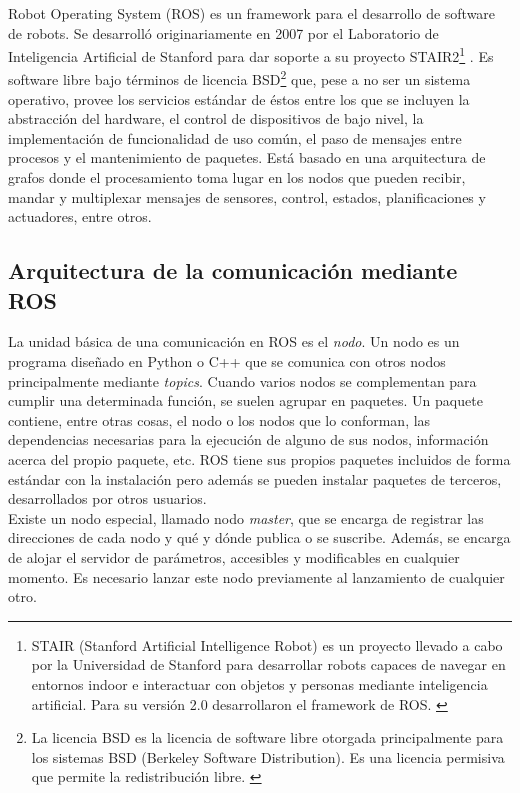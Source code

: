 Robot Operating System (ROS) es un framework para el desarrollo de software de robots. Se desarrolló originariamente en 2007 por el Laboratorio de Inteligencia Artificial de Stanford para dar soporte a su proyecto STAIR2\footnote{STAIR (Stanford Artificial Intelligence Robot) es un proyecto llevado a cabo por la Universidad de Stanford para desarrollar robots capaces de navegar en entornos indoor e interactuar con objetos y personas mediante inteligencia artificial. Para su versión 2.0 desarrollaron el framework de ROS. \cite{stair}} \cite{stair_paper}. Es software libre bajo términos de licencia BSD\footnote{La licencia BSD es la licencia de software libre otorgada principalmente para los sistemas BSD (Berkeley Software Distribution). Es una licencia permisiva que permite la redistribución libre. \cite{licencia}} que, pese a no ser un sistema operativo, provee los servicios estándar de éstos entre los que se incluyen la abstracción del hardware, el control de dispositivos de bajo nivel, la implementación de funcionalidad de uso común, el paso de mensajes entre procesos y el mantenimiento de paquetes. Está basado en una arquitectura de grafos donde el procesamiento toma lugar en los nodos que pueden recibir, mandar y multiplexar mensajes de sensores, control, estados, planificaciones y actuadores, entre otros.\\


\subsection{Arquitectura de la comunicación mediante ROS}

La unidad básica de una comunicación en ROS es el \textit{nodo}. Un nodo es un programa diseñado en Python o C++ que se comunica con otros nodos principalmente mediante \textit{topics}. Cuando varios nodos se complementan para cumplir una determinada función, se suelen agrupar en paquetes. Un paquete contiene, entre otras cosas, el nodo o los nodos que lo conforman, las dependencias necesarias para la ejecución de alguno de sus nodos, información acerca del propio paquete, etc. ROS tiene sus propios paquetes incluidos de forma estándar con la instalación pero además se pueden instalar paquetes de terceros, desarrollados por otros usuarios.\\

Existe un nodo especial, llamado nodo \textit{master}, que se encarga de registrar las direcciones de cada nodo y qué y dónde publica o se suscribe. Además, se encarga de alojar el servidor de parámetros, accesibles y modificables en cualquier momento. Es necesario lanzar este nodo previamente al lanzamiento de cualquier otro. \\

